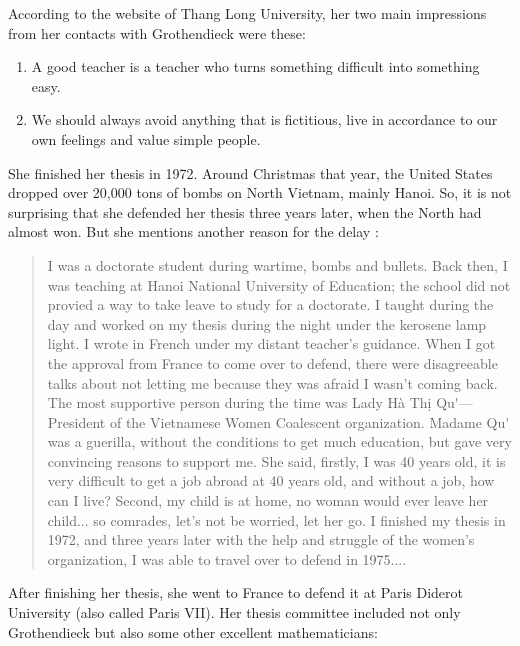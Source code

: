 \documentclass[reqno]{amsart}
\theoremstyle{definition}
\begin{document}
According to the website of Thang Long University, her two main impressions from her contacts with Grothendieck were these:

\begin{enumerate}
\item A good teacher is a teacher who turns something difficult into something easy.

\item We should always avoid anything that is fictitious, live in accordance to our own feelings and value simple people.
\end{enumerate}

She finished her thesis in 1972.   Around Christmas that year, the United States dropped over 20,000 tons of bombs on North Vietnam, mainly Hanoi.  So, it is not surprising that she defended her thesis three years later, when the North had almost won.   But she mentions another reason for the delay \cite{T19}:

\begin{quote}
I was a doctorate student during wartime, bombs and bullets. Back then, I was teaching at Hanoi National University of Education; the school did not provied a way to take leave to study for a doctorate. I taught during the day and worked on my thesis during the night under the kerosene lamp light. I wrote in French under my distant teacher's guidance. When I got the approval from France to come over to defend, there were disagreeable talks about not letting me because they was afraid I wasn't coming back. The most supportive person during the time was Lady H\`a Th\d i Qu{\selectfont  \'\ecircumflex}---President of the Vietnamese Women Coalescent organization. Madame Qu{\selectfont  \'\ecircumflex} was a guerilla, without the conditions to get much education, but gave very convincing reasons to support me.  She said, firstly, I was 40 years old, it is very difficult to get a job abroad at 40 years old, and without a job, how can I live? Second, my child is at home, no woman would ever leave her child... so comrades, let's not be worried, let her go.  I finished my thesis in 1972, and three years later with the help and struggle of the women's organization, I was able to travel over to defend in 1975....
\end{quote}

After finishing her thesis, she went to France to defend it at Paris Diderot University (also called Paris VII).  Her thesis committee included not only Grothendieck but also some other excellent mathematicians: 
\end{document}
